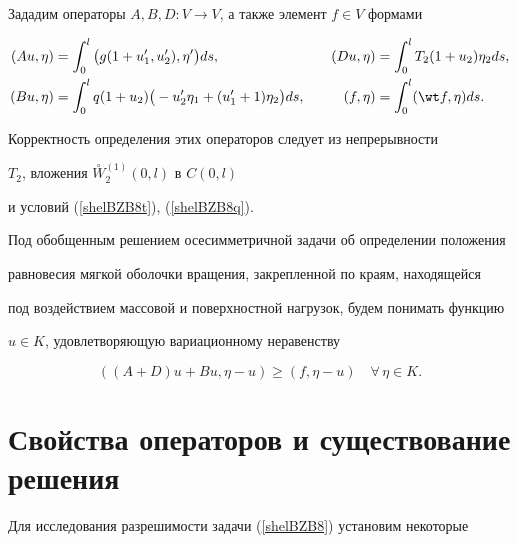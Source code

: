 Зададим операторы $A, B, D: V \to V$, а также элемент $f \in V$ формами


\begin{alignat*}{2}


(Au,\eta)&= \int_{0}^{l}


\big(g(1+u_1',u_2'), \eta' \big) ds, &\quad


(Du,\eta)&= \int_{0}^{l}T_{2} (1+u_2) \eta_2 ds, \\


%


(Bu,\eta)&= \int_{0}^{l}q (1+ {u_2})


\big(- {u}_{2}' \eta_{1}+({u}_{1}'+1) \eta_{2} \big)ds,


&\quad (f,\eta)&=\int_{0}^{l}(\wt f,\eta) ds.


\end{alignat*}


Корректность определения этих операторов следует из непрерывности


$T_2$, вложения $\overset{\circ}{W}{}^{(1)}_2 (0, l)$ в $C(0,l)$


и условий (\ref{shelBZB8t}), (\ref{shelBZB8q}).





Под обобщенным решением осесимметричной задачи об определении положения


равновесия мягкой оболочки вращения, закрепленной по краям, находящейся


под воздействием массовой и поверхностной нагрузок, будем понимать функцию


$u \in K$, удовлетворяющую вариационному неравенству


\begin{equation}


((A+D)u+B u, \eta-u)\geq (f, \eta-u) \quad \forall \, \eta \in K.


\label{shelBZB8}


\end{equation}








\section{Свойства операторов и существование решения}





Для исследования разрешимости задачи (\ref{shelBZB8}) установим некоторые


